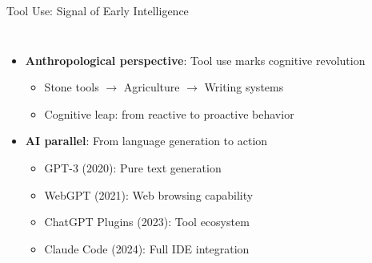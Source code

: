 \documentclass[aspectratio=169]{beamer}
\begin{document}
\begin{frame}{Tool Use: Signal of Early Intelligence}
	\begin{columns}
		\column{\textwidth}
		\begin{itemize}
			\item {\color{highlight}\textbf{Anthropological perspective}}: Tool use marks cognitive revolution
			\begin{itemize}
				\item Stone tools $\rightarrow$ Agriculture $\rightarrow$ Writing systems
				\item Cognitive leap: from reactive to proactive behavior
			\end{itemize}
			\item {\color{highlight}\textbf{AI parallel}}: From language generation to action
			\begin{itemize}
				\item GPT-3 (2020): Pure text generation
				\item WebGPT (2021): Web browsing capability
				\item ChatGPT Plugins (2023): Tool ecosystem
				\item Claude Code (2024): Full IDE integration
			\end{itemize}
		\end{itemize}
	\end{columns}
\end{frame}
\end{document}
